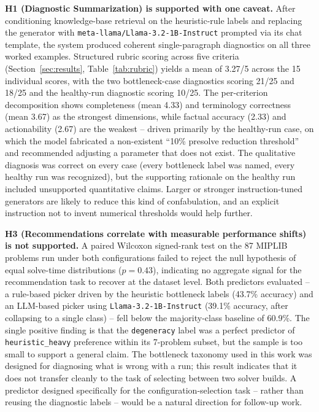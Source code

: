 \documentclass[11pt]{article}
\begin{document}
\textbf{H1 (Diagnostic Summarization) is supported with one caveat.} After conditioning knowledge-base retrieval on the heuristic-rule labels and replacing the generator with \texttt{meta-llama/Llama-3.2-1B-Instruct} prompted via its chat template, the system produced coherent single-paragraph diagnostics on all three worked examples. Structured rubric scoring across five criteria (Section~\ref{sec:results}, Table~\ref{tab:rubric}) yields a mean of 3.27/5 across the 15 individual scores, with the two bottleneck-case diagnostics scoring 21/25 and 18/25 and the healthy-run diagnostic scoring 10/25. The per-criterion decomposition shows completeness (mean 4.33) and terminology correctness (mean 3.67) as the strongest dimensions, while factual accuracy (2.33) and actionability (2.67) are the weakest -- driven primarily by the healthy-run case, on which the model fabricated a non-existent ``10\% presolve reduction threshold'' and recommended adjusting a parameter that does not exist. The qualitative diagnosis was correct on every case (every bottleneck label was named, every healthy run was recognized), but the supporting rationale on the healthy run included unsupported quantitative claims. Larger or stronger instruction-tuned generators are likely to reduce this kind of confabulation, and an explicit instruction not to invent numerical thresholds would help further.

\textbf{H3 (Recommendations correlate with measurable performance shifts) is not supported.} A paired Wilcoxon signed-rank test on the 87 MIPLIB problems run under both configurations failed to reject the null hypothesis of equal solve-time distributions ($p = 0.43$), indicating no aggregate signal for the recommendation task to recover at the dataset level. Both predictors evaluated -- a rule-based picker driven by the heuristic bottleneck labels (43.7\% accuracy) and an LLM-based picker using \texttt{Llama-3.2-1B-Instruct} (39.1\% accuracy, after collapsing to a single class) -- fell below the majority-class baseline of 60.9\%. The single positive finding is that the \texttt{degeneracy} label was a perfect predictor of \texttt{heuristic\_heavy} preference within its 7-problem subset, but the sample is too small to support a general claim. The bottleneck taxonomy used in this work was designed for diagnosing what is wrong with a run; this result indicates that it does not transfer cleanly to the task of selecting between two solver builds. A predictor designed specifically for the configuration-selection task -- rather than reusing the diagnostic labels -- would be a natural direction for follow-up work.
\end{document}
